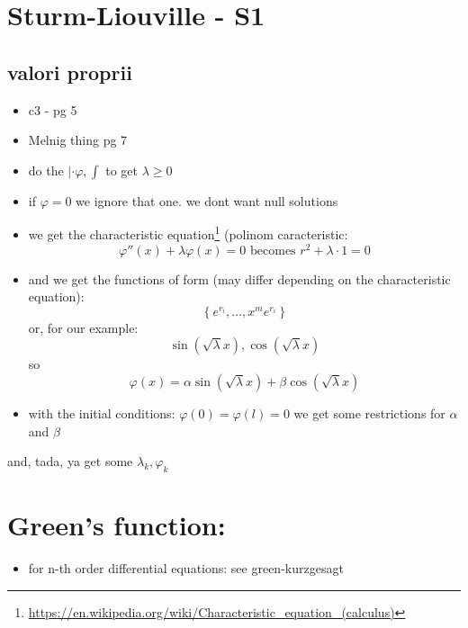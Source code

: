 \documentclass[11pt]{article}
\begin{document}
\section*{Sturm-Liouville - S1}
\label{sec:org2b4f4eb}
\subsection*{valori proprii}
\label{sec:org9db0e4b}
\begin{itemize}
\item c3 - pg 5
\item Melnig thing pg 7

\item do the \(|\cdot \varphi, \int\) to get \(\lambda \geq 0\)
\item if \(\varphi = 0\) we ignore that one. we dont want null solutions
\end{itemize}

\begin{itemize}
 \item we get the characteristic 
 equation\footnote{\url{https://en.wikipedia.org/wiki/Characteristic_equation_(calculus)}} (polinom caracteristic:
  \[ \varphi''(x) + \lambda \varphi(x) =0  \text{ becomes } r^2 + \lambda\cdot 1 = 0 \]  
\end{itemize}
\begin{itemize}
\item and we get the functions of form (may differ depending on the characteristic equation):
\[\left \{ e^{r_i}, \ldots, x^m e^{r_i} \right\} \] 
or, for our example:
\[ \sin(\sqrt{\lambda} x), \cos(\sqrt{\lambda} x) \] 
so 
\[\varphi(x) = \alpha \sin(\sqrt{\lambda} x) + \beta \cos(\sqrt{\lambda} x) \]
\item with the initial conditions: \(\varphi(0) = \varphi(l) = 0\)
we get some restrictions for \(\alpha\) and \(\beta\)
\end{itemize}
and, tada, ya get some \(\lambda_k, \varphi_k\)

\section*{Green's function:}
\label{sec:org422db96}
\begin{itemize}
\item for n-th order differential equations:
see green-kurzgesagt
\end{itemize}
\end{document}
